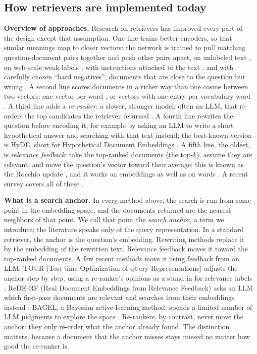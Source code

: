 \documentclass[12pt,a4paper]{article}
\begin{document}
\subsection{How retrievers are implemented today}

\textbf{Overview of approaches.} Research on retrievers has improved every part of the design except that assumption. One line trains better encoders, so that similar meanings map to closer vectors: the network is trained to pull matching question-document pairs together and push other pairs apart, on unlabeled text \citep{izacard2022contriever}, on web-scale weak labels \citep{wang2022e5}, with instructions attached to the text \citep{su2023instructor}, and with carefully chosen ``hard negatives'', documents that are close to the question but wrong \citep{qu2021rocketqa,xiong2021ance}. A second line scores documents in a richer way than one cosine between two vectors: one vector per word \citep{khattab2020colbert}, or vectors with one entry per vocabulary word \citep{formal2021splade}. A third line adds a \emph{re-ranker}: a slower, stronger model, often an LLM, that re-orders the top candidates the retriever returned \citep{nogueira2020monot5,sun2023rankgpt}. A fourth line rewrites the question before encoding it, for example by asking an LLM to write a short hypothetical answer and searching with that text instead; the best-known version is HyDE, short for Hypothetical Document Embeddings \citep{wang2023query2doc,gao2023hyde}. A fifth line, the oldest, is \emph{relevance feedback}: take the top-ranked documents (the top-$k$), assume they are relevant, and move the question's vector toward their average; this is known as the Rocchio update \citep{rocchio1971relevance}, and it works on embeddings as well as on words \citep{li2023vectorprf}. A recent survey covers all of these \citep{zhao2024densesurvey}.

\textbf{What is a search anchor.} In every method above, the search is run from some point in the embedding space, and the documents returned are the nearest neighbors of that point. We call that point the \emph{search anchor}, a term we introduce; the literature speaks only of the query representation. In a standard retriever, the anchor is the question's embedding. Rewriting methods replace it by the embedding of the rewritten text. Relevance feedback moves it toward the top-ranked documents. A few recent methods move it using feedback from an LLM: TOUR (Test-time Optimization of qUery Representations) adjusts the anchor step by step, using a re-ranker's opinions as a stand-in for relevance labels \citep{sung2023tour}; ReDE-RF (Real Document Embeddings from Relevance Feedback) asks an LLM which first-pass documents are relevant and searches from their embeddings instead \citep{jataria2024rederf}; BAGEL, a Bayesian active-learning method, spends a limited number of LLM judgments to explore the space \citep{bagel2026}. Re-rankers, by contrast, never move the anchor: they only re-order what the anchor already found. The distinction matters, because a document that the anchor misses stays missed no matter how good the re-ranker is.
\end{document}
